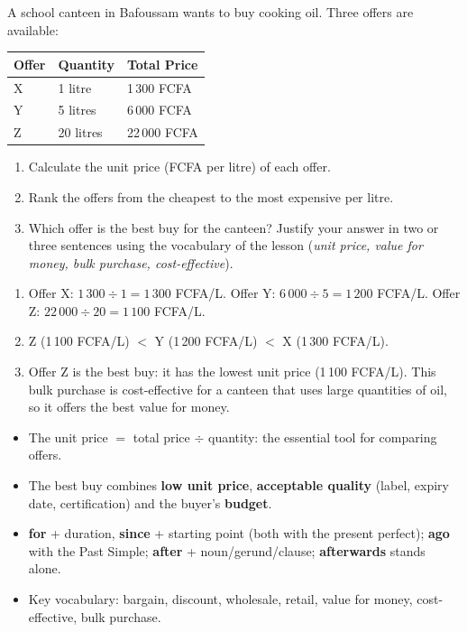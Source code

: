 \documentclass[11pt]{article}
\newcommand{\cle}[1]{{\popxbold\color{popdark}#1}}
\begin{document}
\begin{exercice}
A school canteen in Bafoussam wants to buy cooking oil. Three offers are available:
\begin{center}
\begin{tabularx}{\linewidth}{|l|X|X|}\hline
\rowcolor{popblueL}\textbf{Offer} & \textbf{Quantity} & \textbf{Total Price} \\ \hline
X & 1 litre & 1\,300 FCFA \\ \hline
Y & 5 litres & 6\,000 FCFA \\ \hline
Z & 20 litres & 22\,000 FCFA \\ \hline
\end{tabularx}
\end{center}
\begin{enumerate}
\item Calculate the \cle{unit price} (FCFA per litre) of each offer.
\item Rank the offers from the cheapest to the most expensive per litre.
\item Which offer is the \cle{best buy} for the canteen? Justify your answer in two or three sentences using the vocabulary of the lesson (\emph{unit price, value for money, bulk purchase, cost-effective}).
\end{enumerate}
\end{exercice}

\begin{corrige}
\begin{enumerate}
\item Offer X: $1\,300 \div 1 = 1\,300$ FCFA/L. Offer Y: $6\,000 \div 5 = 1\,200$ FCFA/L. Offer Z: $22\,000 \div 20 = 1\,100$ FCFA/L.
\item Z (1\,100 FCFA/L) $<$ Y (1\,200 FCFA/L) $<$ X (1\,300 FCFA/L).
\item Offer Z is the \cle{best buy}: it has the lowest \cle{unit price} (1\,100 FCFA/L). This \cle{bulk purchase} is \cle{cost-effective} for a canteen that uses large quantities of oil, so it offers the best \cle{value for money}.
\end{enumerate}
\end{corrige}

\begin{aretenir}
\begin{itemize}
\item The \cle{unit price} $=$ total price $\div$ quantity: the essential tool for comparing offers.
\item The \cle{best buy} combines \textbf{low unit price}, \textbf{acceptable quality} (label, \cle{expiry date}, certification) and the buyer's \textbf{budget}.
\item \textbf{for} + duration, \textbf{since} + starting point (both with the present perfect); \textbf{ago} with the Past Simple; \textbf{after} + noun/gerund/clause; \textbf{afterwards} stands alone.
\item Key vocabulary: \cle{bargain}, \cle{discount}, \cle{wholesale}, \cle{retail}, \cle{value for money}, \cle{cost-effective}, \cle{bulk purchase}.
\end{itemize}
\end{aretenir}
\end{document}
